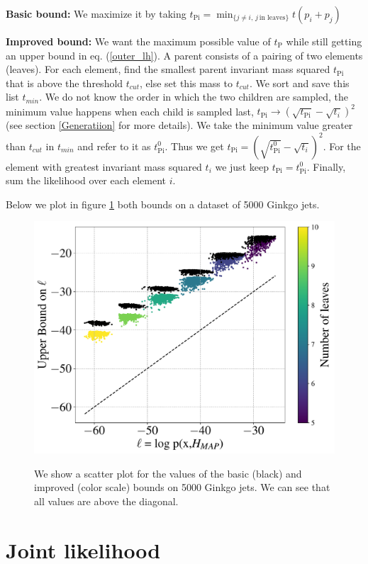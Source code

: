 \documentclass[12pt]{article}
\begin{document}
{\bf Basic bound:} We maximize it by taking $t_{\text{Pi}} = \min_{\{j \neq i,\, j\, \text{in leaves}\}} t(p_i+p_j)$

{\bf Improved bound:}
We want the maximum possible value of  $t_{\text{P}}$ while still getting an upper bound in  eq. (\ref{outer_lh}).
A parent consists of a pairing of two elements (leaves). For each element, find the smallest parent invariant mass squared $t_{\text{Pi}}$ that is above the threshold $t_{cut}$, else set this mass to $t_{cut}$. We sort and save this list $t_{min}$.
We do not know the order in which the two children are sampled, the minimum value happens when each child is sampled last, $t_{\text{Pi}} \rightarrow (\sqrt{t_{\text{Pi}}} - \sqrt{t_i})^2$  (see section \ref{Generatiion} for more details). We take the minimum value greater than $t_{cut}$ in $t_{min}$ and refer to it as $t^0_{\text{Pi}}$. Thus we get  $t_{\text{Pi}} =  (\sqrt{t^0_{\text{Pi}}} - \sqrt{t_i})^2$. For the element with greatest invariant mass squared $t_i$ we just keep $t_{\text{Pi}} =t^0_{\text{Pi}}$.
Finally, sum the likelihood over each element $i$.


Below we plot in figure \ref{fig:bounds} both bounds on a dataset of  5000 Ginkgo jets.
\begin{figure}
{
  \includegraphics[width=0.6\linewidth]{figs/UpperBoundsonLogLH_exact.pdf}
}
\caption{\small{We show a scatter plot for the values of the basic (black) and improved (color scale) bounds on 5000 Ginkgo jets. We can see that all values are above the diagonal.
}}
\label{fig:bounds}
\end{figure}


\section{Joint likelihood}
\end{document}
